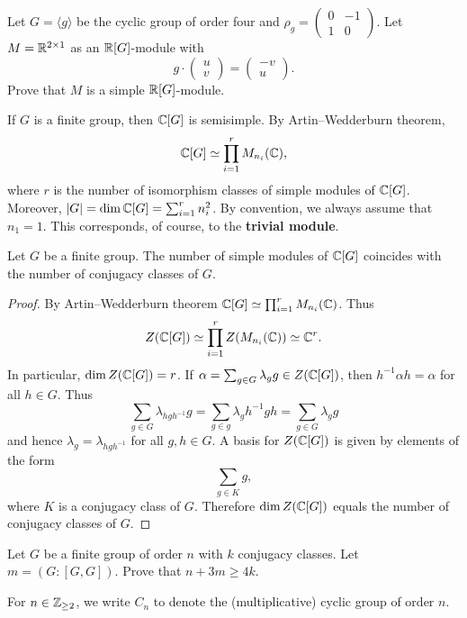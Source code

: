 \begin{exercise}
Let $G=\langle g\rangle$ be the cyclic group 
of order four and $\rho_g=\begin{pmatrix}
0&-1\\
1&0\end{pmatrix}$. 
Let $M=\mathbb{R}^{2\times 1}$ as an $\mathbb{R}[G]$-module with 
\[
g\cdot\begin{pmatrix}u\\v\end{pmatrix}
=\begin{pmatrix}-v\\u\end{pmatrix}.
\]
Prove that $M$ is a simple $\mathbb{R}[G]$-module. 
\end{exercise}

If $G$ is a finite group, 
then $\mathbb{C}[G]$ is semisimple. By Artin--Wedderburn theorem, 
\[
\mathbb{C}[G]\simeq\prod_{i=1}^r M_{n_i}(\mathbb{C}),
\]
where $r$ is the number of isomorphism classes of simple modules of $\mathbb{C}[G]$. Moreover, 
$|G|=\dim\mathbb{C}[G]=\sum_{i=1}^r n_i^2$. By convention, 
we always assume that $n_1=1$. 
This corresponds, of course, to the \textbf{trivial module}. 

\begin{theorem}
    Let $G$ be a finite group. The number of simple 
    modules of $\mathbb{C}[G]$ coincides with the number of conjugacy classes of $G$. 
\end{theorem}

\begin{proof}
    By Artin--Wedderburn theorem $\mathbb{C}[G]\simeq\prod_{i=1}^rM_{n_i}(\mathbb{C})$. Thus 
    \[
		Z(\mathbb{C}[G])\simeq\prod_{i=1}^rZ(M_{n_i}(\mathbb{C}))\simeq\mathbb{C}^r.
	\]
	In particular, $\dim Z(\mathbb{C}[G])=r$. If $\alpha=\sum_{g\in
	G}\lambda_gg\in Z(\mathbb{C}[G])$, then $h^{-1}\alpha h=\alpha$ for all $h\in
	G$. Thus 
	\[
		\sum_{g\in G}\lambda_{hgh^{-1}}g=
		\sum_{g\in g}\lambda_g h^{-1}gh=\sum_{g\in G}\lambda_gg
	\]
	and hence $\lambda_{g}=\lambda_{hgh^{-1}}$ for all $g,h\in G$. A basis for 
	$Z(\mathbb{C}[G])$ is given by elements of the form 
	\[
		\sum_{g\in K}g,
	\]
	where $K$ is a conjugacy class of $G$. Therefore $\dim Z(\mathbb{C}[G])$ equals 
	the number of conjugacy classes of $G$.
\end{proof}

\begin{exercise}
    Let $G$ be a finite group of order $n$ with $k$ conjugacy classes.
    Let $m=(G:[G,G])$. Prove that $n+3m\geq4k$. 
\end{exercise}

For $n\in\mathbb{Z}_{\geq2}$, we write $C_n$ to denote the (multiplicative) cyclic group of order $n$. 

